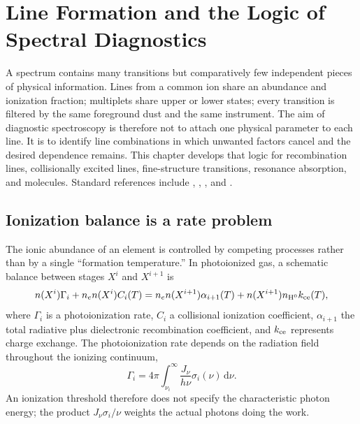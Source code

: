 
\chapter{Line Formation and the Logic of Spectral Diagnostics}
\label{chap:line-formation-diagnostics}

A spectrum contains many transitions but comparatively few independent pieces of
physical information.  Lines from a common ion share an abundance and ionization
fraction; multiplets share upper or lower states; every transition is filtered by the
same foreground dust and the same instrument.  The aim of diagnostic spectroscopy is
therefore not to attach one physical parameter to each line.  It is to identify line
combinations in which unwanted factors cancel and the desired dependence remains.
This chapter develops that logic for recombination lines, collisionally excited
lines, fine-structure transitions, resonance absorption, and molecules.  Standard
references include \citet{OsterbrockFerland2006}, \citet{DopitaSutherland2003},
\citet{Draine2011}, and \citet{Tielens2005}.

\section{Ionization balance is a rate problem}

The ionic abundance of an element is controlled by competing processes rather than
by a single ``formation temperature.''  In photoionized gas, a schematic balance
between stages $X^i$ and $X^{i+1}$ is
\begin{equation}
 n(X^i)\Gamma_i + n_en(X^i)C_i(T)
 =n_en(X^{i+1})\alpha_{i+1}(T)
  + n(X^{i+1})n_{\rm H^0}k_{\rm ce}(T),
 \label{eq:ionization-balance-general}
\end{equation}
where $\Gamma_i$ is a photoionization rate, $C_i$ a collisional ionization
coefficient, $\alpha_{i+1}$ the total radiative plus dielectronic recombination
coefficient, and $k_{\rm ce}$ represents charge exchange.  The photoionization rate
depends on the radiation field throughout the ionizing continuum,
\begin{equation}
 \Gamma_i=4\pi\int_{\nu_i}^{\infty}
 \frac{J_\nu}{h\nu}\sigma_i(\nu)\,\mathrm{d}\nu .
 \label{eq:photoionization-rate}
\end{equation}
An ionization threshold therefore does not specify the characteristic photon energy;
the product $J_\nu\sigma_i/\nu$ weights the actual photons doing the work.

